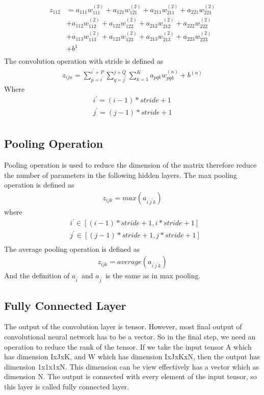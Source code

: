 \documentclass[a4paper]{article}
\begin{document}
\begin{align*}
z_{112} & = a_{111} w_{111}^{(2)} + a_{121} w_{121}^{(2)} + a_{211} w_{211}^{(2)} + a_{221} w_{221}^{(2)}\\
		& + a_{112} w_{112}^{(2)} + a_{122} w_{122}^{(2)} + a_{212} w_{212}^{(2)} + a_{222} w_{222}^{(2)}\\	
		& + a_{113} w_{113}^{(2)} + a_{123} w_{123}^{(2)} + a_{213} w_{213}^{(2)} + a_{223} w_{223}^{(2)}\\	
		& + b^{1}\\
\end{align*}
The convolution operation with stride is defined as \\
\begin{align*}
	z_{ijn} = \sum_{p=i^{'}}^{i^{'}+P} \sum_{q=j^{'}}^{j+Q} \sum_{k=1}^{K} a_{pqk} w_{pqk}^{(n)} + b^{(n)}
\end{align*}
Where 
\begin{align*}
	i^{'} = (i-1)*stride +1\\
	j^{'} = (j-1)*stride +1\\
\end{align*}
\subsection{Pooling Operation}
Pooling operation is used to reduce the dimension of the matrix therefore reduce the number of parameters in the following hidden layers. The max pooling operation is defined as
\begin{align*}
	z_{ijk} = max (a_{i^{'}j^{'}k})
\end{align*}
where
\begin{align*}
	&i^{'} \in [(i-1)*stride +1, i*stride +1] \\
	&j^{'} \in [(j-1)*stride +1, j*stride +1] \\
\end{align*}
The average pooling operation is defined as
\begin{align*}
	z_{ijk} = average (a_{i^{'}j^{'}k})
\end{align*}
And the definition of $a_{i^{'}}$ and $a_{j^{'}}$ is the same as in max pooling.
\subsection{Fully Connected Layer}
The output of the convolution layer is tensor. However, most final output of convolutional neural network has to be a vector. So in the final step, we need an operation to reduce the rank of the tensor. If we take the input tensor A which has dimension IxJxK, and W which has dimension IxJxKxN, then the output has dimension 1x1x1xN. This dimension can be view effectively has a vector which as dimension N. The output is connected with every element of the input tensor, so this layer is called fully connected layer.
\end{document}
